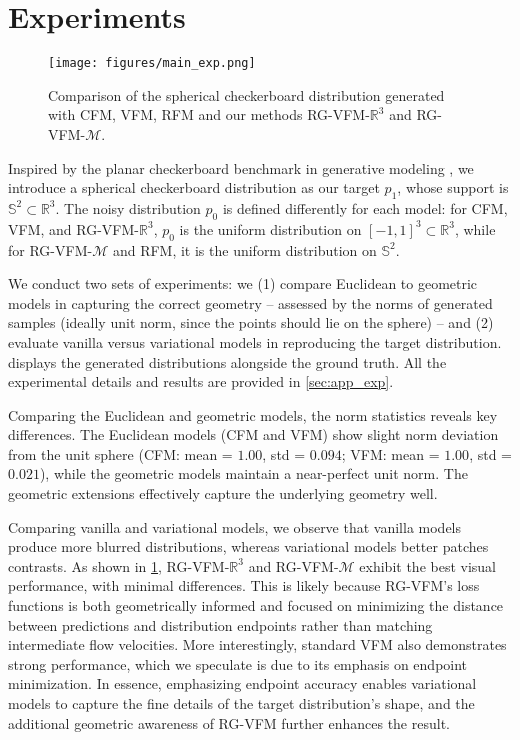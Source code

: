 \section{Experiments}\label{sec:experiments}

\begin{figure}[t!]
    \centering
    \texttt{[image: figures/main\_exp.png]} 
    \caption{Comparison of the spherical checkerboard distribution generated with CFM, VFM, RFM and our methods  RG-VFM-$\mathbb{R}^3$ and RG-VFM-$\mathcal{M}$.}
    \label{fig:main_exp}
\end{figure}

Inspired by the planar checkerboard benchmark in generative modeling \citep{grathwohl2018ffjord}, we introduce a spherical checkerboard distribution as our target $p_1$, whose support is $\mathbb{S}^2 \subset \mathbb{R}^3$. The noisy distribution $p_0$ is defined differently for each model: for CFM, VFM, and RG-VFM-$\mathbb{R}^3$, $p_0$ is the uniform distribution on $[-1,1]^3 \subset \mathbb{R}^3$, while for RG-VFM-$\mathcal{M}$ and RFM, it is the uniform distribution on $\mathbb{S}^2$. 

We conduct two sets of experiments: we (1) compare Euclidean to geometric models in capturing the correct geometry -- assessed by the norms of generated samples (ideally unit norm, since the points should lie on the sphere) -- and (2) evaluate vanilla versus variational models in reproducing the target distribution.  displays the generated distributions alongside the ground truth. All the experimental details and results are provided in \cref{sec:app_exp}.

Comparing the Euclidean and geometric models, the norm statistics reveals key differences. The Euclidean models (CFM and VFM) show slight norm deviation from the unit sphere (CFM: mean = $1.00$, std = $0.094$; VFM: mean = $1.00$, std = $0.021$), while the geometric models maintain a near-perfect unit norm. The geometric extensions effectively capture the underlying geometry well.

Comparing vanilla and variational models, we observe that vanilla models produce more blurred distributions, whereas variational models better patches contrasts. As shown in \cref{fig:main_exp}, RG-VFM-$\mathbb{R}^3$ and RG-VFM-$\mathcal{M}$ exhibit the best visual performance, with minimal differences. This is likely because RG-VFM's loss functions is both geometrically informed and focused on minimizing the distance between predictions and distribution endpoints rather than matching intermediate flow velocities. More interestingly, standard VFM also demonstrates strong performance, which we speculate is due to its emphasis on endpoint minimization. In essence, emphasizing endpoint accuracy enables variational models to capture the fine details of the target distribution's shape, and the additional geometric awareness of RG-VFM further enhances the result.


